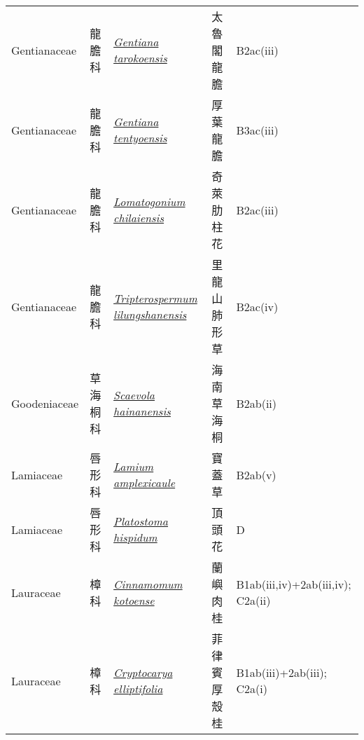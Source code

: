 {\begin{longtable}{p{2.5cm}p{2.5cm}p{4.5cm}p{2.5cm}p{3cm}}
    Gentianaceae & 龍膽科 & \href{http://www.theplantlist.org/tpl1.1/search?q=Gentiana+tarokoensis}{\textit{Gentiana tarokoensis} } & 太魯閣龍膽 & B2ac(iii) \index{Gentiana@\textit{Gentiana}!tarokoensis@\textit{tarokoensis}}  \index{太魯閣龍膽} \\
    Gentianaceae & 龍膽科 & \href{http://www.theplantlist.org/tpl1.1/search?q=Gentiana+tentyoensis}{\textit{Gentiana tentyoensis} } & 厚葉龍膽 & B3ac(iii) \index{Gentiana@\textit{Gentiana}!tentyoensis@\textit{tentyoensis}}  \index{厚葉龍膽} \\
    Gentianaceae & 龍膽科 & \href{http://www.theplantlist.org/tpl1.1/search?q=Lomatogonium+chilaiensis}{\textit{Lomatogonium chilaiensis} } & 奇萊肋柱花 & B2ac(iii) \index{Lomatogonium@\textit{Lomatogonium}!chilaiensis@\textit{chilaiensis}}  \index{奇萊肋柱花} \\
    Gentianaceae & 龍膽科 & \href{http://www.theplantlist.org/tpl1.1/search?q=Tripterospermum+lilungshanensis}{\textit{Tripterospermum lilungshanensis} } & 里龍山肺形草 & B2ac(iv) \index{Tripterospermum@\textit{Tripterospermum}!lilungshanensis@\textit{lilungshanensis}}  \index{里龍山肺形草} \\
    Goodeniaceae & 草海桐科 & \href{http://www.theplantlist.org/tpl1.1/search?q=Scaevola+hainanensis}{\textit{Scaevola hainanensis} } & 海南草海桐 & B2ab(ii) \index{Scaevola@\textit{Scaevola}!hainanensis@\textit{hainanensis}}  \index{海南草海桐} \\
    Lamiaceae & 唇形科 & \href{http://www.theplantlist.org/tpl1.1/search?q=Lamium+amplexicaule}{\textit{Lamium amplexicaule} } & 寶蓋草 & B2ab(v) \index{Lamium@\textit{Lamium}!amplexicaule@\textit{amplexicaule}}  \index{寶蓋草} \\
    Lamiaceae & 唇形科 & \href{http://www.theplantlist.org/tpl1.1/search?q=Platostoma+hispidum}{\textit{Platostoma hispidum} } & 頂頭花 & D \index{Platostoma@\textit{Platostoma}!hispidum@\textit{hispidum}}  \index{頂頭花} \\
    Lauraceae & 樟科 & \href{http://www.theplantlist.org/tpl1.1/search?q=Cinnamomum+kotoense}{\textit{Cinnamomum kotoense} } & 蘭嶼肉桂 & B1ab(iii,iv)+2ab(iii,iv); C2a(ii) \index{Cinnamomum@\textit{Cinnamomum}!kotoense@\textit{kotoense}}  \index{蘭嶼肉桂} \\
    Lauraceae & 樟科 & \href{http://www.theplantlist.org/tpl1.1/search?q=Cryptocarya+elliptifolia}{\textit{Cryptocarya elliptifolia} } & 菲律賓厚殼桂 & B1ab(iii)+2ab(iii); C2a(i) \index{Cryptocarya@\textit{Cryptocarya}!elliptifolia@\textit{elliptifolia}}  \index{菲律賓厚殼桂} \\

\end{longtable}}
